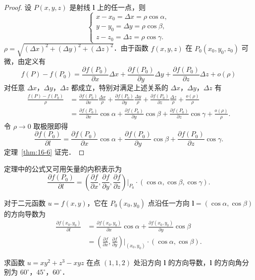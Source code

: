 \begin{proof}
设 $P(x,y,z)$ 是射线 $\bm{l}$ 上的任一点，则
\[
\begin{cases}
x-x_{0}=\Delta x=\rho\cos\alpha,\\
y-y_{0}=\Delta y=\rho\cos\beta,\\
z-z_{0}=\Delta z=\rho\cos\gamma.
\end{cases}
\]
$\rho=\sqrt{(\Delta x)^{2}+(\Delta y)^{2}+(\Delta z)^{2}}$．由于函数 $f(x,y,z)$ 在 $P_{0}(x_{0},y_{0},z_{0})$ 可微，由定义有
\[
f(P)-f(P_{0})=\frac{\partial f(P_{0})}{\partial x}\Delta x+\frac{\partial f(P_{0})}{\partial y}\Delta y+\frac{\partial f(P_{0})}{\partial z}\Delta z+o(\rho)
\]
对任意 $\Delta x$，$\Delta y$，$\Delta z$ 都成立，特别对满足上述关系的 $\Delta x$，$\Delta y$，$\Delta z$ 有
\[
\begin{aligned}
\frac{f(P)-f(P_{0})}{\rho}&=\frac{\partial f(P_{0})}{\partial x}\frac{\Delta x}{\rho}+\frac{\partial f(P_{0})}{\partial y}\frac{\Delta y}{\rho}+\frac{\partial f(P_{0})}{\partial z}\frac{\Delta z}{\rho}+\frac{o(\rho)}{\rho}\\
&=\frac{\partial f(P_{0})}{\partial x}\cos\alpha+\frac{\partial f(P_{0})}{\partial y}\cos\beta+\frac{\partial f(P_{0})}{\partial z}\cos\gamma+\frac{o(\rho)}{\rho}.
\end{aligned}
\]
令 $\rho\to 0$ 取极限即得
\[
\frac{\partial f(P_{0})}{\partial l}=\frac{\partial f(P_{0})}{\partial x}\cos\alpha+\frac{\partial f(P_{0})}{\partial y}\cos\beta+\frac{\partial f(P_{0})}{\partial z}\cos\gamma.
\]
定理~\ref{thm:16-6} 证完．
\end{proof}

定理中的公式又可用矢量的内积表示为
\[
\frac{\partial f(P_{0})}{\partial l}=\left(\frac{\partial f}{\partial x},\frac{\partial f}{\partial y},\frac{\partial f}{\partial z}\right)\bigg|_{P_{0}}\cdot(\cos\alpha,\cos\beta,\cos\gamma).
\]

对于二元函数 $u=f(x,y)$，它在 $P_{0}(x_{0},y_{0})$ 点沿任一方向 $\bm{l}=(\cos\alpha,\cos\beta)$ 的方向导数为
\[
\begin{aligned}
\frac{\partial f(x_{0},y_{0})}{\partial l}&=\frac{\partial f(x_{0},y_{0})}{\partial x}\cos\alpha+\frac{\partial f(x_{0},y_{0})}{\partial y}\cos\beta\\
&=\left(\frac{\partial f}{\partial x},\frac{\partial f}{\partial y}\right)\bigg|_{(x_{0},y_{0})}\cdot(\cos\alpha,\cos\beta).
\end{aligned}
\]

\begin{example}\label{ex:16-4-1}
求函数 $u=xy^{2}+z^{3}-xyz$ 在点 $(1,1,2)$ 处沿方向 $\bm{l}$ 的方向导数，$\bm{l}$ 的方向角分别为 $60^{\circ}$，$45^{\circ}$，$60^{\circ}$．
\end{example}

